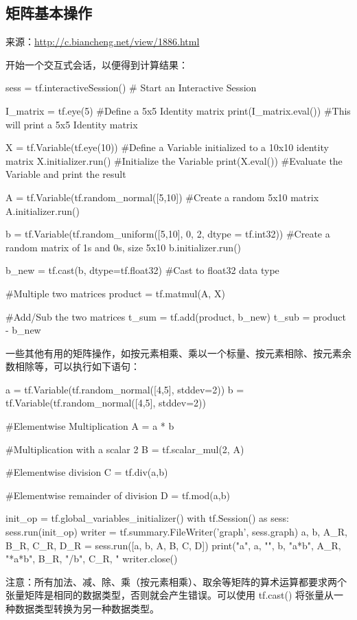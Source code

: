 \documentclass[12pt]{article}
\begin{document}
\subsection{矩阵基本操作}
来源：\url{http://c.biancheng.net/view/1886.html}

开始一个交互式会话，以便得到计算结果：
\begin{python}
sess = tf.interactiveSession() # Start an Interactive Session

I_matrix = tf.eye(5) #Define a 5x5 Identity matrix
print(I_matrix.eval()) #This will print a 5x5 Identity matrix

X = tf.Variable(tf.eye(10)) #Define a Variable initialized to a 10x10 identity matrix
X.initializer.run() #Initialize the Variable
print(X.eval()) #Evaluate the Variable and print the result

A = tf.Variable(tf.random_normal([5,10]) #Create a random 5x10 matrix
A.initializer.run()

b = tf.Variable(tf.random_uniform([5,10], 0, 2, dtype = tf.int32)) #Create a random matrix of 1s and 0s, size 5x10
b.initializer.run()

b_new = tf.cast(b, dtype=tf.float32) #Cast to float32 data type

#Multiple two matrices
product = tf.matmul(A, X)

#Add/Sub the two matrices
t_sum = tf.add(product, b_new)
t_sub = product - b_new
\end{python}

一些其他有用的矩阵操作，如按元素相乘、乘以一个标量、按元素相除、按元素余数相除等，可以执行如下语句：
\begin{python}
a = tf.Variable(tf.random_normal([4,5], stddev=2))
b = tf.Variable(tf.random_normal([4,5], stddev=2))

#Elementwise Multiplication
A = a * b

#Multiplication with a scalar 2
B = tf.scalar_mul(2, A)

#Elementwise division
C = tf.div(a,b)

#Elementwise remainder of division
D = tf.mod(a,b)

init_op = tf.global_variables_initializer()
with tf.Session() as sess:
	sess.run(init_op)
	writer = tf.summary.FileWriter('graph', sess.graph)
	a, b, A_R, B_R, C_R, D_R = sess.run([a, b, A, B, C, D])
	print("a\n", a, "\nb\n", b, "a*b\n", A_R, "*a*b\n", B_R, "\na/b", C_R, "\na%
writer.close()
\end{python}
注意：所有加法、减、除、乘（按元素相乘）、取余等矩阵的算术运算都要求两个张量矩阵是相同的数据类型，否则就会产生错误。可以使用 tf.cast() 将张量从一种数据类型转换为另一种数据类型。
\end{document}
